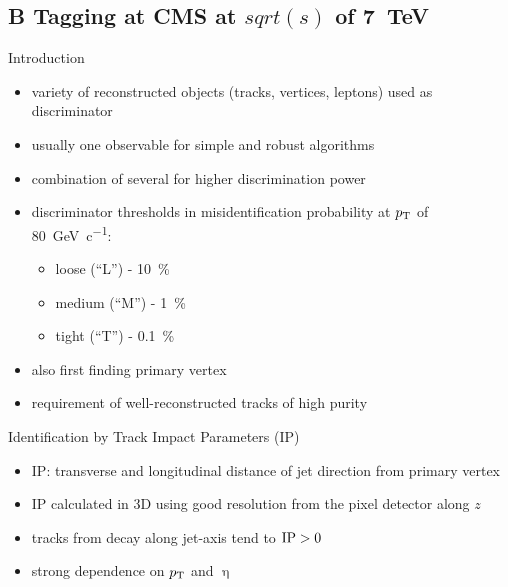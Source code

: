 \subsection{B Tagging at CMS at $sqrt(s)$ of \SI{7}{\tera\electronvolt}}
\begin{frame}{Introduction}
	
	\begin{itemize}\itemfill
		\item variety of reconstructed objects (tracks, vertices, leptons) used as discriminator
		\item usually one observable for simple and robust algorithms 
		\item combination of several for higher discrimination power
		\item discriminator thresholds in misidentification probability at $p_{\text{T}}$ of \SI{80}{\giga\electronvolt\per c}:
		\begin{itemize}
			\item loose (``L'') - \SI{10}{\%}
			\item medium (``M'') - \SI{1}{\%}
			\item tight (``T'') - \SI{.1}{\%}
		\end{itemize}
		\item also first finding primary vertex 
		\item requirement of well-reconstructed tracks of high purity
	\end{itemize}

\end{frame}
\begin{frame}{Identification by Track Impact Parameters (IP)}

	\begin{minipage}[c][.4\textheight]{.6\textwidth}
		\begin{itemize}\itemfill
		\item IP: transverse and longitudinal distance of jet direction from primary vertex
		\item IP calculated in 3D using good resolution from the pixel detector along $z$
		\item tracks from decay along jet-axis \ra tend to $\text{IP}>0$
		\item strong dependence on $p_{\text{T}}$ and $\upeta$
		\end{itemize}
	\end{minipage}
	\begin{minipage}{.38\textwidth}
	\end{minipage}
	

\end{frame}
